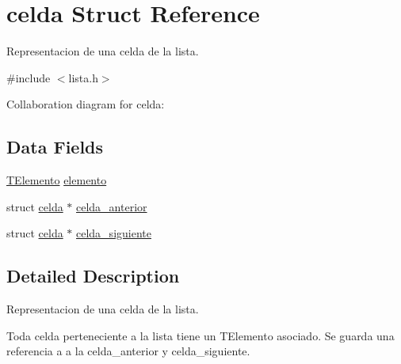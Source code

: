 \hypertarget{structcelda}{\section{celda Struct Reference}
\label{structcelda}
}


Representacion de una celda de la lista.  




{\ttfamily \#include $<$lista.\+h$>$}



Collaboration diagram for celda\+:
\subsection*{Data Fields}
\begin{DoxyCompactItemize}
\item 
\hyperlink{lista_8h_a7994b6059a81be0ecfe9887d1715b8a7}{T\+Elemento} \hyperlink{structcelda_adfe2fa858bb3d3eec2e92de4d5d72cee}{elemento}
\item 
struct \hyperlink{structcelda}{celda} $\ast$ \hyperlink{structcelda_a240705efbe1b76882e39896993c42484}{celda\+\_\+anterior}
\item 
struct \hyperlink{structcelda}{celda} $\ast$ \hyperlink{structcelda_ad7e05643abca9e67556ea588fd1d6ab1}{celda\+\_\+siguiente}
\end{DoxyCompactItemize}


\subsection{Detailed Description}
Representacion de una celda de la lista. 

Toda celda perteneciente a la lista tiene un T\+Elemento asociado. Se guarda una referencia a a la celda\+\_\+anterior y celda\+\_\+siguiente. 

